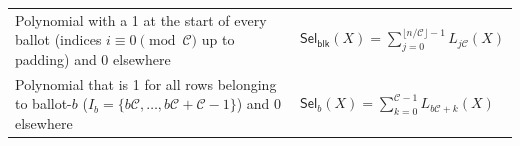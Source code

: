\begin{table}[t]
\begin{tabular}{@{}p{0.6\linewidth}|p{0.4\linewidth}@{}}
Polynomial with a 1 at the start of every ballot (indices $i\equiv 0\!\!\pmod{\mathcal{C}}$ up to padding) and 0 elsewhere&
$\mathsf{Sel}_{\mathsf{blk}}(X)=\displaystyle\sum_{j=0}^{\lfloor n/\mathcal{C}\rfloor-1} L_{j\mathcal{C}}(X)$ \\

Polynomial that is 1 for all rows belonging to ballot-$b$ ($I_b=\{b\mathcal{C},\dots,b\mathcal{C}+\mathcal{C}-1\}$) and 0 elsewhere &
$\mathsf{Sel}_{b}(X)=\displaystyle\sum_{k=0}^{\mathcal{C}-1} L_{b\mathcal{C}+k}(X)$ \\



\bottomrule
\end{tabular}
\end{table}





